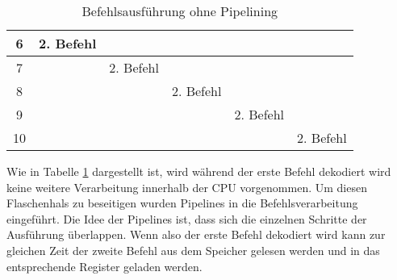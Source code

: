 \documentclass[12pt]{article}
\begin{document}
\begin{table}[!htb]
\begin{tabular}{|c|l|l|l|l|l|}
6    & 2. Befehl                                                                        &                                 &                                                                                 &                                &                                                                                            \\ \hline
7    &                                                                                  & 2. Befehl                       &                                                                                 &                                &                                                                                            \\ \hline
8    &                                                                                  &                                 & 2. Befehl                                                                       &                                &                                                                                            \\ \hline
9    &                                                                                  &                                 &                                                                                 & 2. Befehl                      &                                                                                            \\ \hline
10   &                                                                                  &                                 &                                                                                 &                                & 2. Befehl                                                                                  \\ \hline


\end{tabular}
\caption{Befehlsausführung ohne Pipelining \protect\cite{mikroprozessortechnik2011}}
\label{noPipeline}
\end{table}

\par\bigskip\noindent Wie in Tabelle \ref{noPipeline} dargestellt ist, wird während der erste Befehl dekodiert wird keine weitere Verarbeitung innerhalb der CPU vorgenommen. Um diesen Flaschenhals zu beseitigen wurden Pipelines in die Befehlsverarbeitung eingeführt. Die Idee der Pipelines ist, dass sich die einzelnen Schritte der Ausführung überlappen. Wenn also der erste Befehl dekodiert wird kann zur gleichen Zeit der zweite Befehl aus dem Speicher gelesen werden und in das entsprechende Register geladen werden.
\end{document}
